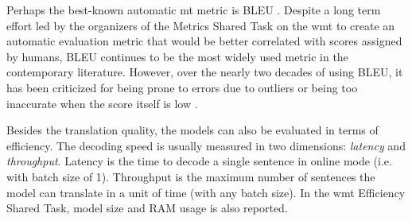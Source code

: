 Perhaps the best-known automatic \ac{mt} metric is BLEU
\citep{papineni-etal-2002-bleu}.  Despite a long term effort led by the
organizers of the Metrics Shared Task on the \ac{wmt} to create an automatic
evaluation metric that would be better correlated with scores assigned by
humans, BLEU continues to be the most widely used metric in the contemporary
literature. However, over the nearly two decades of using BLEU, it has been
criticized for being prone to errors due to outliers or being too inaccurate
when the score itself is low \citep{callison-burch-etal-2006-evaluating,
  bojar-etal-2010-tackling, reiter2018structured, mathur-etal-2020-tangled,
  kocmi2021ship}.


Besides the translation quality, the models can also be evaluated in terms of
efficiency. The decoding speed is usually measured in two dimensions:
\emph{latency} and \emph{throughput}. Latency is the time to decode a single
sentence in online mode (i.e. with batch size of 1). Throughput is the maximum
number of sentences the model can translate in a unit of time (with any batch
size). In the \ac{wmt} Efficiency Shared Task, model size and RAM usage is also
reported.


